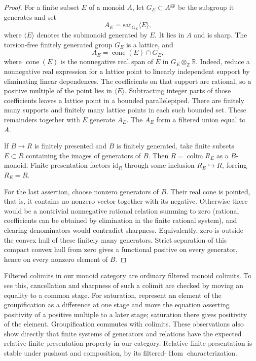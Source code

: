 \documentclass[11pt]{article}
\theoremstyle{definition}
\theoremstyle{remark}
\newcommand{\Z}{\mathbb Z}
\newcommand{\R}{\mathbb R}
\newcommand{\gp}{\mathrm{gp}}
\newcommand{\sat}{\mathrm{sat}}
\newcommand{\Hom}{\operatorname{Hom}}
\newcommand{\colim}{\operatorname*{colim}}
\begin{document}
\begin{proof}
For a finite subset $E$ of a monoid $A$, let $G_E\subset A^{\gp}$ be the subgroup it generates and set
\[
 A_E=\sat_{G_E}\langle E\rangle,
\]
where $\langle E\rangle$ denotes the submonoid generated by $E$. It lies in $A$ and is sharp. The torsion-free finitely generated group $G_E$ is a lattice, and
\[
 A_E=\operatorname{cone}(E)\cap G_E,
\]
where $\operatorname{cone}(E)$ is the nonnegative real span of $E$ in $G_E\otimes_\Z\R$. Indeed, reduce a nonnegative real expression for a lattice point to linearly independent support by eliminating linear dependences. The coefficients on that support are rational, so a positive multiple of the point lies in $\langle E\rangle$. Subtracting integer parts of those coefficients leaves a lattice point in a bounded parallelepiped. There are finitely many supports and finitely many lattice points in each such bounded set. These remainders together with $E$ generate $A_E$. The $A_E$ form a filtered union equal to $A$.

If $B\to R$ is finitely presented and $B$ is finitely generated, take finite subsets $E\subset R$ containing the images of generators of $B$. Then $R=\colim R_E$ as a $B$-monoid. Finite presentation factors $\mathrm{id}_R$ through some inclusion $R_E\hookrightarrow R$, forcing $R_E=R$.

For the last assertion, choose nonzero generators of $B$. Their real cone is pointed, that is, it contains no nonzero vector together with its negative. Otherwise there would be a nontrivial nonnegative rational relation summing to zero (rational coefficients can be obtained by elimination in the finite rational system), and clearing denominators would contradict sharpness. Equivalently, zero is outside the convex hull of these finitely many generators. Strict separation of this compact convex hull from zero gives a functional positive on every generator, hence on every nonzero element of $B$.
\end{proof}

Filtered colimits in our monoid category are ordinary filtered monoid colimits. To see this, cancellation and sharpness of such a colimit are checked by moving an equality to a common stage. For saturation, represent an element of the groupification as a difference at one stage and move the equation asserting positivity of a positive multiple to a later stage; saturation there gives positivity of the element. Groupification commutes with colimits. These observations also show directly that finite systems of generators and relations have the expected relative finite-presentation property in our category. Relative finite presentation is stable under pushout and composition, by its filtered-$\Hom$ characterization.
\end{document}
